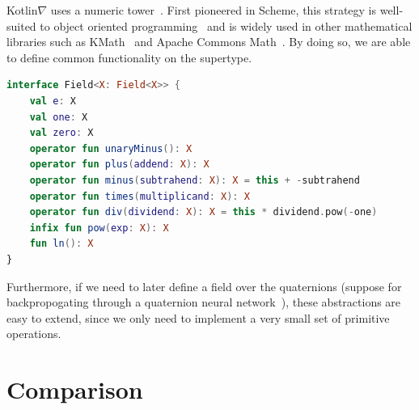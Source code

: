 \documentclass[12pt,initial,twoside,maitrise]{dms}
\numberwithin{equation}{section}
\numberwithin{table}{chapter}
\numberwithin{figure}{chapter}
\begin{document}
Kotlin$\nabla$ uses a numeric tower~\cite{st2012typing}. First pioneered in Scheme\cite{sperber2009revised}, this strategy is well-suited to object oriented programming~\cite{niculescu2003design, niculescu2011using} and is widely used in other mathematical libraries such as KMath~\cite{nozik2019acat} and Apache Commons Math~\cite{developers2012apache}. By doing so, we are able to define common functionality on the supertype.

\begin{lstlisting}[caption={Many common mathematical operations can be defined in simpler terms.}, language=Kotlin]
interface Field<X: Field<X>> {
    val e: X
    val one: X
    val zero: X
    operator fun unaryMinus(): X
    operator fun plus(addend: X): X
    operator fun minus(subtrahend: X): X = this + -subtrahend
    operator fun times(multiplicand: X): X
    operator fun div(dividend: X): X = this * dividend.pow(-one)
    infix fun pow(exp: X): X
    fun ln(): X
}
\end{lstlisting}

Furthermore, if we need to later define a field over the quaternions (suppose for backpropogating through a quaternion neural network~\cite{isokawa2003quaternion}), these abstractions are easy to extend, since we only need to implement a very small set of primitive operations.

\section{Comparison}\label{sec:comparison}
\end{document}
